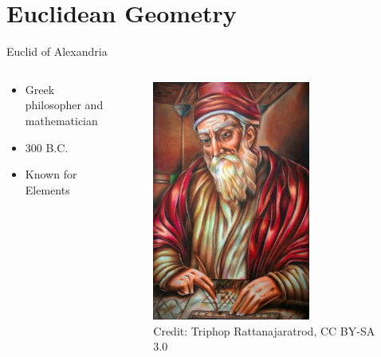 \documentclass[utf8]{beamer}
\begin{document}
\part{Euclidean Geometry}
\begin{frame}
\partpage
\end{frame}

\begin{frame}{Euclid of Alexandria}
\begin{columns}
\begin{column}{0.5\textwidth}
\begin{itemize}
\item Greek philosopher and mathematician
\item 300 B.C.
\item Known for Elements
\end{itemize}
\end{column}
\begin{column}{0.5\textwidth}
\begin{figure}
\centering
\includegraphics[width=0.7\textwidth]{images/euclid.jpg}
\\
\tiny Credit: Triphop Rattanajaratrod, CC BY-SA 3.0
\end{figure}
\end{column}
\end{columns}
\end{frame}
\end{document}
